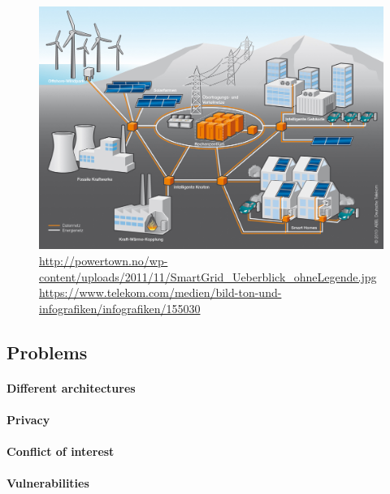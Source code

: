 \begin{figure}
	\includegraphics[width=\textwidth]{figures/SmartGrid_Ueberblick_ohneLegende.jpg}
	\caption{\url{http://powertown.no/wp-content/uploads/2011/11/SmartGrid_Ueberblick_ohneLegende.jpg} \url{https://www.telekom.com/medien/bild-ton-und-infografiken/infografiken/155030}}
	\label{fig:background:smartgrid}
\end{figure}

\subsection{Problems}

\paragraph{Different architectures}

\paragraph{Privacy}

\paragraph{Conflict of interest}

\paragraph{Vulnerabilities}
